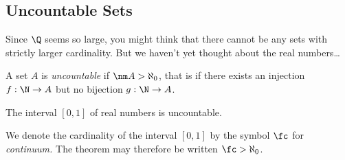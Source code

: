 \subsection{Uncountable Sets}


Since $\Q$ seems so large, you might think that there cannot be any sets with strictly larger cardinality. But we haven't yet thought about the real numbers\ldots

\begin{defn}
A set $A$ is \emph{uncountable} if $\nm A>\aleph_0$, that is if there exists an injection $f:\N\to A$ but no bijection $g:\N\to A$.
\end{defn}

\begin{thm}
The interval $[0,1]$ of real numbers is uncountable.
\end{thm}

\noindent We denote the cardinality of the interval $[0,1]$ by the symbol $\fc$ for \emph{continuum.} The theorem may therefore be written $\fc>\aleph_0$.


